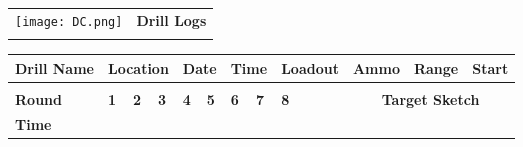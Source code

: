 \documentclass[../Cover.tex]{subfiles}
\begin{document}
\begin{minipage}[t][0.15\textheight][t]{\textwidth}
	\begin{tabular}{p{} p{}}
	\texttt{[image: DC.png]} & \textbf{Drill Logs} \\
	&\\[.5cm]
	\end{tabular}
\end{minipage}
\begin{minipage}[t][0.85\textheight][t]{\textwidth}
	\begin{tabular}{|l|l|l|l|l|l|l|l|l|l|l|l|l|l|l|l|l|l|l|l|}
		\hline
		\multicolumn{3}{|l|}{\cellcolor[HTML]{C0C0C0}\textbf{Drill Name}} & \multicolumn{3}{l|}{\cellcolor[HTML]{C0C0C0}\textbf{Location}}                                               & \multicolumn{2}{l|}{\cellcolor[HTML]{C0C0C0}\textbf{Date}}              & \multicolumn{2}{l|}{\cellcolor[HTML]{C0C0C0}\textbf{Time}}              & \multicolumn{3}{l|}{\cellcolor[HTML]{C0C0C0}\textbf{Loadout}} & \multicolumn{3}{l|}{\cellcolor[HTML]{C0C0C0}\textbf{Ammo}} & \multicolumn{2}{l|}{\cellcolor[HTML]{C0C0C0}\textbf{Range}} & \multicolumn{2}{l|}{\cellcolor[HTML]{C0C0C0}\textbf{Start}} \\ \hline
		\multicolumn{3}{|l|}{}                                            & \multicolumn{3}{l|}{}                                                                                        & \multicolumn{2}{l|}{}                                                   & \multicolumn{2}{l|}{}                                                   & \multicolumn{3}{l|}{}                                         & \multicolumn{3}{l|}{}                                      & \multicolumn{2}{l|}{}                                       & \multicolumn{2}{l|}{}                                       \\ \hline
		\multicolumn{3}{|l|}{\cellcolor[HTML]{C0C0C0}\textbf{Round}}      & \cellcolor[HTML]{C0C0C0}\textbf{1} & \cellcolor[HTML]{C0C0C0}\textbf{2} & \cellcolor[HTML]{C0C0C0}\textbf{3} & \cellcolor[HTML]{C0C0C0}\textbf{4} & \cellcolor[HTML]{C0C0C0}\textbf{5} & \cellcolor[HTML]{C0C0C0}\textbf{6} & \cellcolor[HTML]{C0C0C0}\textbf{7} & \cellcolor[HTML]{C0C0C0}\textbf{8}        &         & \multicolumn{8}{c|}{\cellcolor[HTML]{C0C0C0}\textbf{Target Sketch}}                                                                                                                              \\ \cline{1-11} \cline{13-20} 
		\multicolumn{3}{|l|}{\textbf{Time}}                               &                                    &                                    &                                    &                                    &                                    &                                    &                                    &                                           &         & \multicolumn{8}{l|}{}                                                                                                                                                                            \\ \cline{1-11}

\end{tabular}
\end{minipage}
\end{document}
